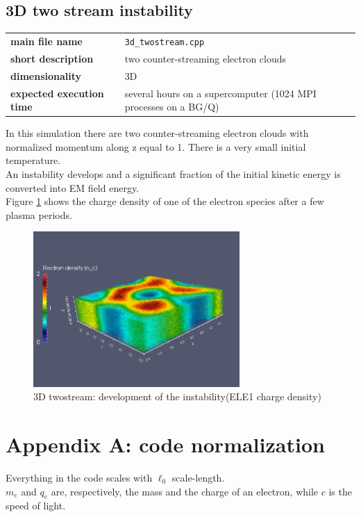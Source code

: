 \documentclass[11pt,a4paper]{report}
\begin{document}
\section{3D two stream instability}
\begin{center}
    \begin{tabular}{ l | l }
    	\textbf{main file name} & \verb+3d_twostream.cpp+\\
    	\textbf{short description} & two counter-streaming electron clouds \\
    	\textbf{dimensionality} & 3D  \\
    	\textbf{expected execution time} & several hours on a supercomputer (1024 MPI processes on a BG/Q)
    \end{tabular}
    \end{center}
In this simulation there are two counter-streaming electron clouds with normalized momentum along z equal to 1. There is a very small initial temperature. \\
An instability develops and a significant fraction of the initial kinetic energy is converted into EM field energy.   \\
Figure \ref{pic_3dtwostream} shows the charge density of one of the electron species after a few plasma periods.
 \begin{figure}[htbp!]
    \centering
    \includegraphics[width=0.70\textwidth]{3d_marta.png}
    \caption{3D twostream: development of the instability(ELE1 charge density)}
	\label{pic_3dtwostream}    
\end{figure}    

 

\chapter*{Appendix A: code normalization}
Everything in the code scales with $\ell_0$ scale-length.\\
$m_e$ and $q_e$ are, respectively, the mass and the charge of an electron, while $c$ is the speed of light.
\end{document}
